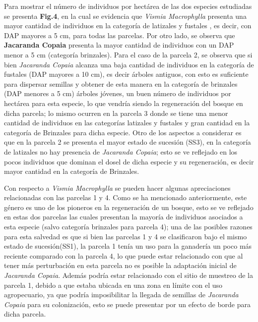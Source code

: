 \documentclass[letterpaper,9pt,onecolumn,twoside,]{pinp}
\begin{document}
Para mostrar el número de individuos por hectárea de las dos especies
estudiadas se presenta \textbf{Fig.4}, en la cual se evidencia que
\emph{Vismia Macrophylla} presenta una mayor cantidad de individuos en
la categoría de latizales y fustales , es decir, con DAP mayores a 5 cm,
para todas las parcelas. Por otro lado, se observa que \textbf{Jacaranda
Copaia} presenta la mayor cantidad de individuos con un DAP menor a 5 cm
(categoría brinzales). Para el caso de la parcela 2, se observa que si
bien \emph{Jacaranda Copaia} alcanza una baja cantidad de individuos
en la categoría de fustales (DAP mayores a 10 cm), es decir árboles
antiguos, con esto es suficiente para dispersar semillas y obtener de
esta manera en la categoría de brinzales (DAP menores a 5 cm) árboles
jóvenes, un buen número de individuos por hectárea para esta especie, lo
que vendría siendo la regeneración del bosque en dicha parcela; lo mismo
ocurren en la parcela 3 donde se tiene una menor cantidad de
individuos en las categorías latizales y fustales y gran cantidad en la
categoría de Brinzales para dicha especie. Otro de los aspectos a
considerar es que en la parcela 2 se presenta el mayor estado de
sucesión (SS3), en la categoría de latizales no hay presencia de
\emph{Jacaranda Copaia}; esto se ve reflejado en los pocos individuos que
dominan el dosel de dicha especie y su regeneración, es decir mayor
cantidad en la categoría de Brinzales.

Con respecto a \emph{Vismia Macrophylla} se pueden hacer algunas
apreciaciones relacionadas con las parcelas 1 y 4. Como se ha mencionado
anteriormente, este género es uno de los pioneros en la regeneración de
un bosque, esto se ve reflejado en estas dos parcelas las cuales
presentan la mayoría de individuos asociados a esta especie (salvo
categoría brinzales para parcela 4); una de las posibles razones para
esta salvedad es que si bien las parcelas 1 y 4 se clasificaron bajo el
mismo estado de sucesión(SS1), la parcela 1 tenía un uso para la
ganadería un poco más reciente comparado con la parcela 4, lo que puede
estar relacionado con que al tener más perturbación en esta parcela no
es posible la adaptación inicial de \emph{Jacaranda Copaia}. Además
podría estar relacionado con el sitio de muestreo de la parcela 1,
debido a que estaba ubicada en una zona en límite con el uso
agropecuario, ya que podría imposibilitar la llegada de semillas de
\emph{Jacaranda Copaia} para su colonización, esto se puede presentar
por un efecto de borde para dicha parcela.
\end{document}

